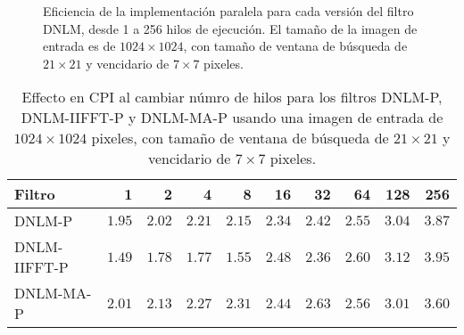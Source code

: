   \begin{figure}
  \centering
  \caption[Eficiencia de las implementaciones paralelas del filtro DNLM.]{Eficiencia de la implementación paralela para cada versión del filtro DNLM, desde 1 a 256 hilos de ejecución. El tama\~no de la imagen de entrada es de $1024\times1024$, con tama\~no de ventana de búsqueda de $21 \times 21$ y vencidario de $7 \times 7$ pixeles. \label{fig:efficiency}}
  \end{figure}
  
  
  
\begin{table}
\protect\caption[Comportamiento del CPI al aumentar numero de hilos]{Effecto en CPI al cambiar númro de hilos para los filtros DNLM-P, DNLM-IIFFT-P y DNLM-MA-P usando una imagen de entrada de  $1024 \times 1024$ pixeles, con tama\~no de ventana de búsqueda de $21 \times 21$ y vencidario de $7 \times 7$ pixeles. \label{tabla:scala1}}
\centering
\begin{tabular}{lrrrrrrrrr}
Filtro & 1& 2& 4& 8& 16&32& 64 &128& 256\tabularnewline
\hline
DNLM-P& $1.95$ & $2.02$ & $2.21$ &  $2.15$ &  $2.34$ & $2.42$  & $2.55$  & $3.04 $ & $3.87$ \tabularnewline
DNLM-IIFFT-P &$1.49$ & $1.78$ & $1.77$ &  $1.55$ &  $2.48$ & $2.36$  & $2.60$  & $3.12$  & $3.95$ \tabularnewline
DNLM-MA-P & $2.01$ & $2.13$ & $2.27$ &  $2.31$ &  $ 2.44$ & $2.63$  & $2.56$  & $3.01$  & $3.60$ \tabularnewline
\end{tabular}
\end{table}
